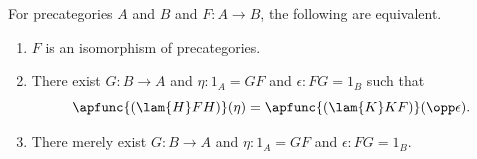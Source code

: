 %
\begin{lem}\label{ct:isoprecat}
  For precategories $A$ and $B$ and $F:A\to B$, the following are equivalent.
  \begin{enumerate}
  \item $F$ is an isomorphism of precategories.\label{item:ct:ipc1}
  \item There exist $G:B\to A$ and $\eta:1_A = GF$ and $\epsilon:FG=1_B$ such that\label{item:ct:ipc2}
    \begin{equation}
      \apfunc{(\lam{H} F H)}({\eta}) = \apfunc{(\lam{K} K F)}({\opp\epsilon}).\label{eq:ct:isoprecattri}
    \end{equation}
  \item There merely exist $G:B\to A$ and $\eta:1_A = GF$ and $\epsilon:FG=1_B$.\label{item:ct:ipc3}
  \end{enumerate}
\end{lem}

